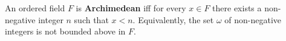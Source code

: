 An ordered field $F$ is \textbf{Archimedean} iff for every $x \in F$ there exists a non-negative integer $n$ such that $x < n$. Equivalently, the set $\omega$ of non-negative integers is not bounded above in $F$.
